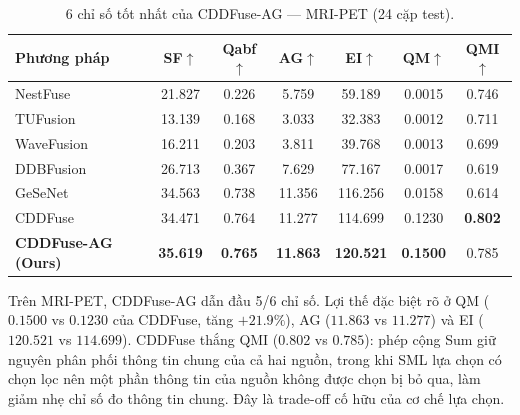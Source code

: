 \documentclass[12pt,a4paper]{article}
\begin{document}
\begin{table}[H]
\centering
\caption{6 chỉ số tốt nhất của CDDFuse-AG --- MRI-PET (24 cặp test).}
\label{tab:best6-pet}
\small
\setlength{\tabcolsep}{5pt}
\begin{tabular}{lcccccc}
\toprule
\textbf{Phương pháp} & \textbf{SF}$\uparrow$ & \textbf{Qabf}$\uparrow$ & \textbf{AG}$\uparrow$ & \textbf{EI}$\uparrow$ & \textbf{QM}$\uparrow$ & \textbf{QMI}$\uparrow$ \\
\midrule
NestFuse~\cite{li2020nestfuse}       & 21.827 & 0.226 & 5.759  & 59.189  & 0.0015 & 0.746 \\
TUFusion~\cite{zhao2024tufusion}     & 13.139 & 0.168 & 3.033  & 32.383  & 0.0012 & 0.711 \\
WaveFusion~\cite{wang2025wavefusion} & 16.211 & 0.203 & 3.811  & 39.768  & 0.0013 & 0.699 \\
DDBFusion~\cite{zhang2025ddbfusion}  & 26.713 & 0.367 & 7.629  & 77.167  & 0.0017 & 0.619 \\
GeSeNet~\cite{li2023gesenet}         & 34.563 & 0.738 & 11.356 & 116.256 & 0.0158 & 0.614 \\
CDDFuse~\cite{zhao2023cddfuse}       & 34.471 & 0.764 & 11.277 & 114.699 & 0.1230 & \textbf{0.802} \\
\midrule
\textbf{CDDFuse-AG (Ours)}           & \textbf{35.619} & \textbf{0.765} & \textbf{11.863} & \textbf{120.521} & \textbf{0.1500} & 0.785 \\
\bottomrule
\end{tabular}
\end{table}

Trên MRI-PET, CDDFuse-AG dẫn đầu 5/6 chỉ số. Lợi thế đặc biệt rõ ở QM ($0.1500$
vs $0.1230$ của CDDFuse, tăng $+21.9\%$), AG ($11.863$ vs $11.277$) và EI
($120.521$ vs $114.699$). CDDFuse thắng QMI ($0.802$ vs $0.785$): phép cộng Sum
giữ nguyên phân phối thông tin chung của cả hai nguồn, trong khi SML lựa chọn có
chọn lọc nên một phần thông tin của nguồn không được chọn bị bỏ qua, làm giảm
nhẹ chỉ số đo thông tin chung. Đây là trade-off cố hữu của cơ chế lựa chọn.
\end{document}
